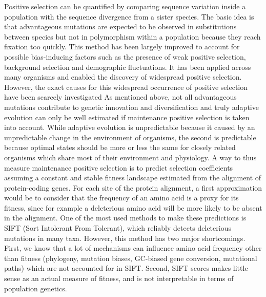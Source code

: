 \documentclass{article}
\newcommand{\NS}[1]{\textcolor{red}{\textbf{\emph{[NS: #1]}}}}
\begin{document}
    Positive selection can be quantified by comparing sequence variation inside a population with the sequence divergence from a sister species\cite{mcdonald_adaptative_1991}.
    The basic idea is that advantageous mutations are expected to be observed in substitutions between species but not in polymorphism within a population because they reach fixation too quickly.
    This method has been largely improved to account for possible bias-inducing factors such as the presence of weak positive selection, background selection and demographic fluctuations\cite{eyre-walker_distribution_2006, eyre-walker_estimating_2009, galtier_adaptive_2016, tataru_inference_2017}.
    It has been applied across many organisms and enabled the discovery of widespread positive selection\cite{moutinho_variation_2019}.
    However, the exact causes for this widespread occurrence of positive selection have been scarcely investigated\cite{eyre-walker_distribution_2006, eyre-walker_estimating_2009, galtier_adaptive_2016} %
    As mentioned above, not all advantageous mutations contribute to genetic innovation and diversification and truly adaptive evolution can only be well estimated if maintenance positive selection is taken into account.
    While adaptive evolution is unpredictable because it caused by an unpredictable change in the environment of organisms, the second is predictable because optimal states should be more or less the same for closely related organisms which share most of their environment and physiology.
    A way to thus measure maintenance positive selection is to predict selection coefficients assuming a constant and stable fitness landscape estimated from the alignment of protein-coding genes.
    For each site of the protein alignment, a first approximation would be to consider that the frequency of an amino acid is a proxy for its fitness, since for example a deleterious amino acid will be more likely to be absent in the alignment.
    One of the most used methods to make these predictions is SIFT (Sort Intolerant From Tolerant), which reliably detects deleterious mutations in many taxa\cite{ng_sift_2003, vaser_sift_2016}.
    However, this method has two major shortcomings.
    First, we know that a lot of mechanisms can influence amino acid frequency other than fitness (phylogeny, mutation biases, GC-biased gene conversion, mutational paths) which are not accounted for in SIFT.
    Second, SIFT scores makes little sense as an actual measure of fitness, and is not interpretable in terms of population genetics.
\end{document}
